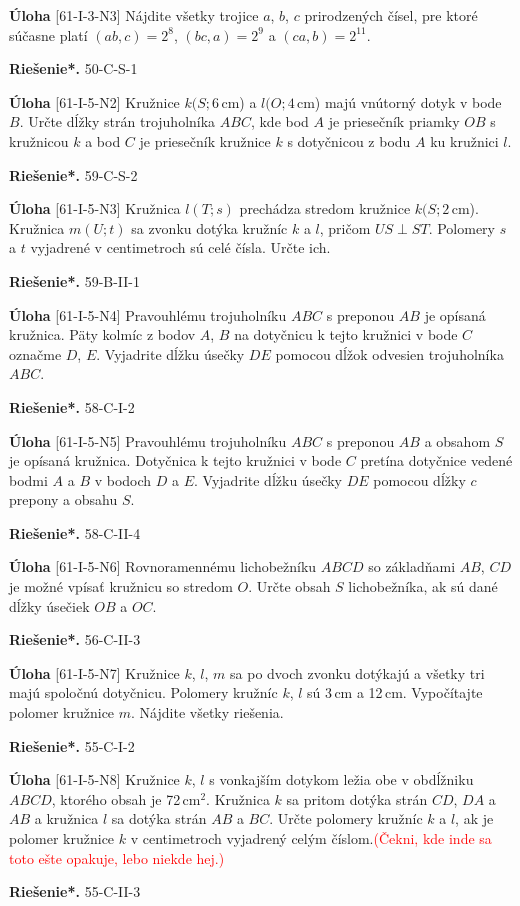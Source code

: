 \documentclass{article}
\newcommand{\rieh}{\textbf{Riešenie*.} }
\newcommand\todo[1]{\noindent\textcolor{red}{(#1)}}
\newcommand{\problem}[3]{
  \begin{tcolorbox}[breakable,notitle,boxrule=0pt,colback=light-gray,colframe=light-gray]
    \textbf{Úloha}
    [#1] #2
  \end{tcolorbox}
  \noindent#3
}
\begin{document}
\problem{61-I-3-N3}{
Nájdite všetky trojice $a$, $b$, $c$ prirodzených čísel, pre ktoré súčasne platí $(ab, c) = 2^8$, $(bc, a) = 2^9$ a $(ca, b) = 2^{11}$.
}{
\rieh 50-C-S-1
}


\problem{61-I-5-N2}{
Kružnice $k(S; 6$\,cm) a $l(O; 4$\,cm) majú vnútorný dotyk v bode $B$. Určte dĺžky strán trojuholníka $ABC$, kde bod $A$ je priesečník priamky $OB$ s kružnicou $k$ a bod $C$ je priesečník kružnice $k$ s dotyčnicou z bodu $A$ ku kružnici $l$.
}{
\rieh 59-C-S-2
}

\problem{61-I-5-N3}{
Kružnica $l(T ; s)$ prechádza stredom kružnice $k(S; 2$\,cm). Kružnica $m(U; t)$ sa zvonku dotýka kružníc $k$ a $l$, pričom $US \perp ST$. Polomery $s$ a $t$ vyjadrené v centimetroch sú
celé čísla. Určte ich.
}{
\rieh 59-B-II-1
}


\problem{61-I-5-N4}{
Pravouhlému trojuholníku $ABC$ s preponou $AB$ je opísaná kružnica. Päty kolmíc z bodov $A$, $B$ na dotyčnicu k tejto kružnici v bode $C$ označme $D$, $E$. Vyjadrite dĺžku úsečky $DE$ pomocou dĺžok odvesien trojuholníka $ABC$.
}{
\rieh 58-C-I-2
}


\problem{61-I-5-N5}{
Pravouhlému trojuholníku $ABC$ s preponou $AB$ a obsahom $S$ je opísaná kružnica. Dotyčnica k tejto kružnici v bode $C$ pretína dotyčnice vedené bodmi $A$ a $B$ v bodoch $D$ a $E$. Vyjadrite dĺžku úsečky $DE$ pomocou dĺžky $c$ prepony a obsahu $S$.
}{
\rieh 58-C-II-4
}


\problem{61-I-5-N6}{
Rovnoramennému lichobežníku $ABCD$ so základňami $AB$, $CD$ je možné vpísať kružnicu so stredom $O$. Určte obsah $S$ lichobežníka, ak sú dané dĺžky úsečiek $OB$ a $OC$.
}{
\rieh 56-C-II-3
}


\problem{61-I-5-N7}
{Kružnice $k$, $l$, $m$ sa po dvoch zvonku dotýkajú a všetky tri majú spoločnú dotyčnicu. Polomery kružníc $k$, $l$ sú 3\,cm a 12\,cm. Vypočítajte polomer kružnice $m$. Nájdite všetky riešenia. 
}{
\rieh 55-C-I-2
}


\problem{61-I-5-N8}{
Kružnice $k$, $l$ s vonkajším dotykom ležia obe v obdĺžniku $ABCD$, ktorého obsah je 72\,cm$^2$. Kružnica $k$ sa pritom dotýka strán $CD$, $DA$ a $AB$ a kružnica $l$ sa dotýka strán $AB$ a $BC$. Určte polomery kružníc $k$ a $l$, ak je polomer kružnice $k$ v centimetroch vyjadrený celým číslom.\todo{Čekni, kde inde sa toto ešte opakuje, lebo niekde hej.}
}{
\rieh 55-C-II-3
}
\end{document}
